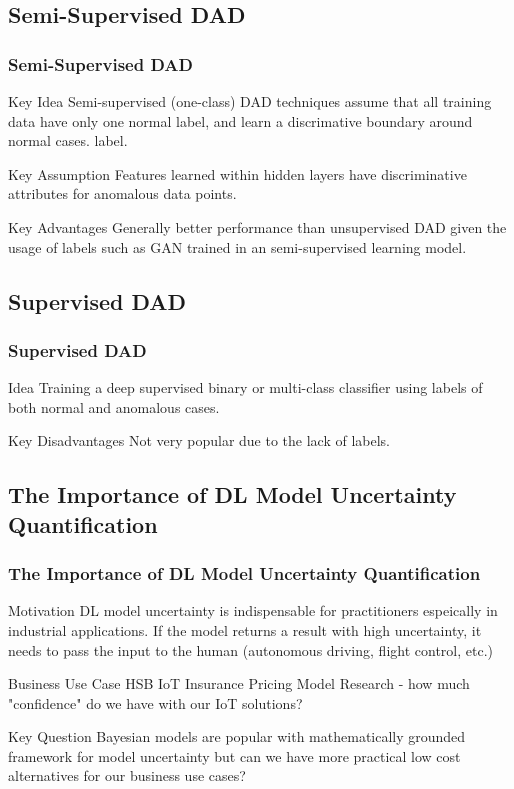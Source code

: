 \documentclass{beamer}
\begin{document}
\subsection{Semi-Supervised DAD}
\begin{frame}
\frametitle{Semi-Supervised DAD}
\begin{block}{Key Idea}
Semi-supervised (one-class) DAD techniques assume that all training data have only one normal label, and learn a discrimative boundary around normal cases.
label.
\end{block}

\begin{block}{Key Assumption}
Features learned within hidden layers have discriminative attributes for anomalous data points.
\end{block}

\begin{block}{Key Advantages}
Generally better performance than unsupervised DAD given the usage of labels such as GAN trained in an semi-supervised learning model.
\end{block}
\end{frame}


\subsection{Supervised DAD}
\begin{frame}
\frametitle{Supervised DAD}
\begin{block}{Idea}
Training a deep supervised binary or multi-class classifier using labels of both normal and anomalous cases.
\end{block}

\begin{block}{Key Disadvantages}
Not very popular due to the lack of labels.
\end{block}
\end{frame}


\subsection{The Importance of DL Model Uncertainty Quantification}
\begin{frame}
\frametitle{The Importance of DL Model Uncertainty Quantification}
\begin{block}{Motivation}
DL model uncertainty is indispensable for practitioners espeically in industrial applications. If the model returns a result with high uncertainty, it needs to pass the input to the human (autonomous driving, flight control, etc.)
\end{block}

\begin{block}{Business Use Case}
HSB IoT Insurance Pricing Model Research - how much "confidence" do we have with our IoT solutions?
\end{block}

\begin{block}{Key Question}
Bayesian models are popular with mathematically grounded framework for model uncertainty but can we have more practical low cost alternatives for our business use cases?
\end{block}
\end{frame}
\end{document}
